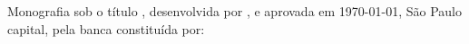 \setlength{\ABNTsignthickness}{0.4pt}
\setlength{\ABNTsignskip}{2cm}

\begin{folhadeaprovacao}

Monografia sob o t\'itulo \ABNTtitulodata , desenvolvida por \ABNTautordata , e aprovada em \today , S\~ao Paulo capital, pela banca constitu\'ida por:
\end{folhadeaprovacao}

% 
% 
% 
%   
%       
%       
% 



